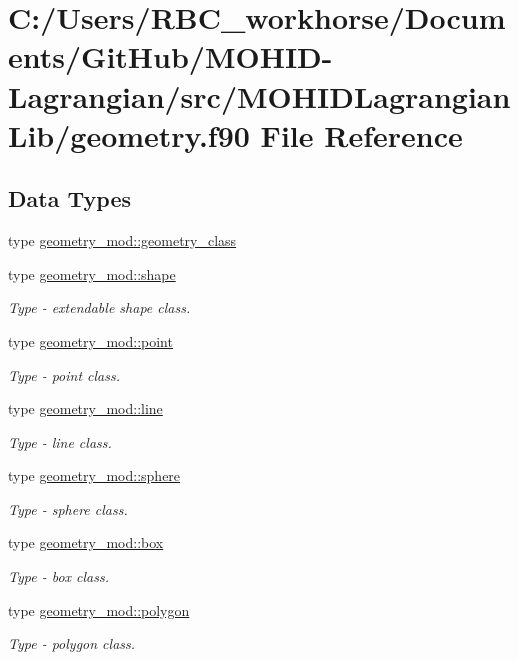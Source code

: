 \hypertarget{geometry_8f90}{}\section{C\+:/\+Users/\+R\+B\+C\+\_\+workhorse/\+Documents/\+Git\+Hub/\+M\+O\+H\+I\+D-\/\+Lagrangian/src/\+M\+O\+H\+I\+D\+Lagrangian\+Lib/geometry.f90 File Reference}
\label{geometry_8f90}
\subsection*{Data Types}
\begin{DoxyCompactItemize}
\item 
type \mbox{\hyperlink{structgeometry__mod_1_1geometry__class}{geometry\+\_\+mod\+::geometry\+\_\+class}}
\item 
type \mbox{\hyperlink{structgeometry__mod_1_1shape}{geometry\+\_\+mod\+::shape}}
\begin{DoxyCompactList}\small\item\em Type -\/ extendable shape class. \end{DoxyCompactList}\item 
type \mbox{\hyperlink{structgeometry__mod_1_1point}{geometry\+\_\+mod\+::point}}
\begin{DoxyCompactList}\small\item\em Type -\/ point class. \end{DoxyCompactList}\item 
type \mbox{\hyperlink{structgeometry__mod_1_1line}{geometry\+\_\+mod\+::line}}
\begin{DoxyCompactList}\small\item\em Type -\/ line class. \end{DoxyCompactList}\item 
type \mbox{\hyperlink{structgeometry__mod_1_1sphere}{geometry\+\_\+mod\+::sphere}}
\begin{DoxyCompactList}\small\item\em Type -\/ sphere class. \end{DoxyCompactList}\item 
type \mbox{\hyperlink{structgeometry__mod_1_1box}{geometry\+\_\+mod\+::box}}
\begin{DoxyCompactList}\small\item\em Type -\/ box class. \end{DoxyCompactList}\item 
type \mbox{\hyperlink{structgeometry__mod_1_1polygon}{geometry\+\_\+mod\+::polygon}}
\begin{DoxyCompactList}\small\item\em Type -\/ polygon class. \end{DoxyCompactList}\end{DoxyCompactItemize}
